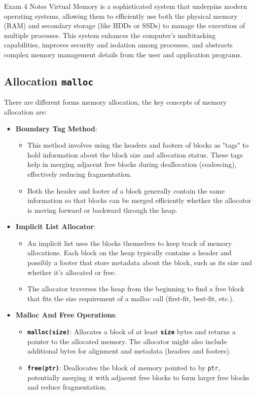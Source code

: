 \begin{examnotes}{Exam 4 Notes}
    Virtual Memory is a sophisticated system that underpins modern operating systems, allowing them to efficiently use both the physical memory (RAM) and secondary storage (like HDDs or SSDs) to 
    manage the execution of multiple processes. This system enhances the computer's multitasking capabilities, improves security and isolation among processes, and abstracts complex memory management 
    details from the user and application programs.

    \subsection*{Allocation \texttt{malloc}}

    There are different forms memory allocation, the key concepts of memory allocation are:

    \begin{itemize}
        \item \textbf{Boundary Tag Method}:
        \begin{itemize}
            \item This method involves using the headers and footers of blocks as "tags" to hold information about the block size and allocation status. These tags help in merging adjacent free blocks 
            during deallocation (coalescing), effectively reducing fragmentation.
            \item Both the header and footer of a block generally contain the same information so that blocks can be merged efficiently whether the allocator is moving forward or backward through the heap.
        \end{itemize}
        \item \textbf{Implicit List Allocator}:
        \begin{itemize}
            \item An implicit list uses the blocks themselves to keep track of memory allocations. Each block on the heap typically contains a header and possibly a footer that store metadata about 
            the block, such as its size and whether it's allocated or free.
            \item The allocator traverses the heap from the beginning to find a free block that fits the size requirement of a malloc call (first-fit, best-fit, etc.).
        \end{itemize}
        \item \textbf{Malloc And Free Operations}:
        \begin{itemize}
            \item \textbf{\texttt{malloc(size)}}: Allocates a block of at least \textbf{\texttt{size}} bytes and returns a pointer to the allocated memory. The allocator might also include additional 
            bytes for alignment and metadata (headers and footers).
            \item \textbf{\texttt{free(ptr)}}: Deallocates the block of memory pointed to by \texttt{ptr}, potentially merging it with adjacent free blocks to form larger free blocks and reduce fragmentation.
        \end{itemize}
    \end{itemize}


\end{examnotes}
